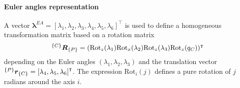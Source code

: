 \paragraph*{Euler angles representation} A vector $\bm{\lambda}^{EA} = \left[\lambda_1,\lambda_2,\lambda_3,\lambda_4,\lambda_5,\lambda_6\right]^\intercal$ is used to define a homogeneous transformation matrix based on a rotation matrix 
\begin{equation}
	      ^{\left\lbrace C \right\rbrace}\bm{R}_{\left\lbrace P \right\rbrace} = (\text{Rot}_z(\lambda_1)\text{Rot}_x(\lambda_2)\text{Rot}_z(\lambda_3)\text{Rot}_z(q_C))^\intercal
\end{equation}
depending on the Euler angles \cite{Siciliano2008RoboticsModellingPlanning} $\left(\lambda_1,\lambda_2,\lambda_3\right)$ and the translation vector $ ^{\left\lbrace P \right\rbrace}\bm{r}_{\left\lbrace C \right\rbrace} = \left[\lambda_4,\lambda_5,\lambda_6\right]^\intercal $. The expression $\text{Rot}_i(j)$ defines a pure rotation of $j$ radians around the axis $i$. 

